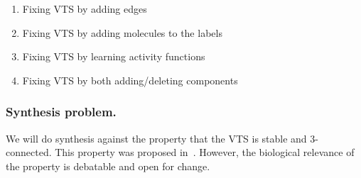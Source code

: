 \begin{enumerate}
	\item Fixing VTS by adding edges 
	\item Fixing VTS by adding molecules to the labels
	\item Fixing VTS by learning activity functions
	\item  Fixing VTS by both adding/deleting components
\end{enumerate}

\subsubsection{Synthesis problem.}

We will do synthesis against the property that the VTS
is stable and 3-connected.
%
%
This property was proposed in~\cite{shukla2017discovering}.
%
However, the biological relevance of the property is debatable and open for change.
%

%
          
